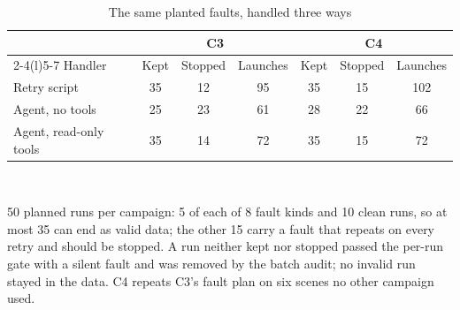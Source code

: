 \begin{table}[t]
\caption{The same planted faults, handled three ways}
\label{tab:recovery}
\centering\footnotesize
\setlength{\tabcolsep}{4pt}
\begin{tabular}{@{}lcccccc@{}}
\toprule
 & \multicolumn{3}{c}{C3} & \multicolumn{3}{c}{C4} \\
\cmidrule(lr){2-4}\cmidrule(l){5-7}
Handler & Kept & Stopped & Launches & Kept & Stopped & Launches \\
\midrule
Retry script & 35 & 12 & 95 & 35 & 15 & 102 \\
Agent, no tools & 25 & 23 & 61 & 28 & 22 & 66 \\
Agent, read-only tools & 35 & 14 & 72 & 35 & 15 & 72 \\
\bottomrule
\end{tabular}
\\[2pt]\parbox{\columnwidth}{\scriptsize 50 planned runs per campaign: 5 of each of 8 fault kinds and 10 clean runs, so at most 35 can end as valid data; the other 15 carry a fault that repeats on every retry and should be stopped. A run neither kept nor stopped passed the per-run gate with a silent fault and was removed by the batch audit; no invalid run stayed in the data. C4 repeats C3's fault plan on six scenes no other campaign used.}
\end{table}
